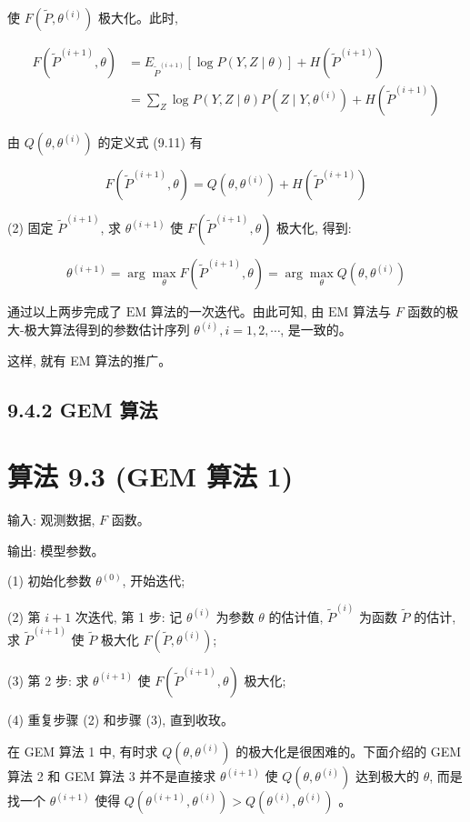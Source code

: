 \documentclass[10pt]{article}
\begin{document}
使 $F\left(\tilde{P}, \theta^{(i)}\right)$ 极大化。此时,

$$
\begin{aligned}
F\left(\tilde{P}^{(i+1)}, \theta\right) & =E_{\tilde{P}^{(i+1)}}[\log P(Y, Z \mid \theta)]+H\left(\tilde{P}^{(i+1)}\right) \\
& =\sum_{Z} \log P(Y, Z \mid \theta) P\left(Z \mid Y, \theta^{(i)}\right)+H\left(\tilde{P}^{(i+1)}\right)
\end{aligned}
$$

由 $Q\left(\theta, \theta^{(i)}\right)$ 的定义式 (9.11) 有

$$
F\left(\tilde{P}^{(i+1)}, \theta\right)=Q\left(\theta, \theta^{(i)}\right)+H\left(\tilde{P}^{(i+1)}\right)
$$

(2) 固定 $\tilde{P}^{(i+1)}$, 求 $\theta^{(i+1)}$ 使 $F\left(\tilde{P}^{(i+1)}, \theta\right)$ 极大化, 得到:

$$
\theta^{(i+1)}=\arg \max _{\theta} F\left(\tilde{P}^{(i+1)}, \theta\right)=\arg \max _{\theta} Q\left(\theta, \theta^{(i)}\right)
$$

通过以上两步完成了 $\mathrm{EM}$ 算法的一次迭代。由此可知, 由 $\mathrm{EM}$ 算法与 $F$ 函数的极大-极大算法得到的参数估计序列 $\theta^{(i)}, i=1,2, \cdots$, 是一致的。

这样, 就有 EM 算法的推广。

\subsection*{9.4.2 GEM 算法}
\section*{算法 9.3 (GEM 算法 1)}
输入: 观测数据, $F$ 函数。

输出: 模型参数。

(1) 初始化参数 $\theta^{(0)}$, 开始迭代;

(2) 第 $i+1$ 次迭代, 第 1 步: 记 $\theta^{(i)}$ 为参数 $\theta$ 的估计值, $\tilde{P}^{(i)}$ 为函数 $\tilde{P}$ 的估计, 求 $\tilde{P}^{(i+1)}$ 使 $\tilde{P}$ 极大化 $F\left(\tilde{P}, \theta^{(i)}\right)$;

(3) 第 2 步: 求 $\theta^{(i+1)}$ 使 $F\left(\tilde{P}^{(i+1)}, \theta\right)$ 极大化;

(4) 重复步骤 (2) 和步骤 (3), 直到收玫。

在 GEM 算法 1 中, 有时求 $Q\left(\theta, \theta^{(i)}\right)$ 的极大化是很困难的。下面介绍的 GEM 算法 2 和 GEM 算法 3 并不是直接求 $\theta^{(i+1)}$ 使 $Q\left(\theta, \theta^{(i)}\right)$ 达到极大的 $\theta$, 而是找一个 $\theta^{(i+1)}$ 使得 $Q\left(\theta^{(i+1)}, \theta^{(i)}\right)>Q\left(\theta^{(i)}, \theta^{(i)}\right)$ 。
\end{document}
